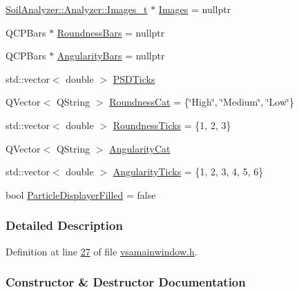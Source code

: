\begin{DoxyCompactItemize}
\item 
\hyperlink{class_soil_analyzer_1_1_analyzer_a55e2c84ab42cb967d718dd18295c1f91}{Soil\+Analyzer\+::\+Analyzer\+::\+Images\+\_\+t} $\ast$ \hyperlink{class_v_s_a_main_window_a5976cf149c1aff5011c75d058f7f1c8a}{Images} = nullptr
\item 
Q\+C\+P\+Bars $\ast$ \hyperlink{class_v_s_a_main_window_afe7a5404f6f35af0c40eb277d91b82ac}{Roundness\+Bars} = nullptr
\item 
Q\+C\+P\+Bars $\ast$ \hyperlink{class_v_s_a_main_window_ac4dc27e6a351ad60f434357aeac9f1c0}{Angularity\+Bars} = nullptr
\item 
std\+::vector$<$ double $>$ \hyperlink{class_v_s_a_main_window_a43651d26dd4d6d8971317d902294317c}{P\+S\+D\+Ticks}
\item 
Q\+Vector$<$ Q\+String $>$ \hyperlink{class_v_s_a_main_window_a8e54a490d67520e7dedd06addd3eaaa9}{Roundness\+Cat} = \{\char`\"{}High\char`\"{}, \char`\"{}Medium\char`\"{}, \char`\"{}Low\char`\"{}\}
\item 
std\+::vector$<$ double $>$ \hyperlink{class_v_s_a_main_window_ace4471ce32443a495cd2c2bb500bef7d}{Roundness\+Ticks} = \{1, 2, 3\}
\item 
Q\+Vector$<$ Q\+String $>$ \hyperlink{class_v_s_a_main_window_ab30d8e8d4b71e2aaad2efa825286e64d}{Angularity\+Cat}
\item 
std\+::vector$<$ double $>$ \hyperlink{class_v_s_a_main_window_ab3adb6772a4766285b7b96e0fb407f62}{Angularity\+Ticks} = \{1, 2, 3, 4, 5, 6\}
\item 
bool \hyperlink{class_v_s_a_main_window_a503125fe2f31e5abd394790fc2768501}{Particle\+Displayer\+Filled} = false
\end{DoxyCompactItemize}


\subsubsection{Detailed Description}


Definition at line \hyperlink{vsamainwindow_8h_source_l00027}{27} of file \hyperlink{vsamainwindow_8h_source}{vsamainwindow.\+h}.



\subsubsection{Constructor \& Destructor Documentation}
\hypertarget{class_v_s_a_main_window_a7fa18757c1fce5c8f41f25277f9e1a70}{}
